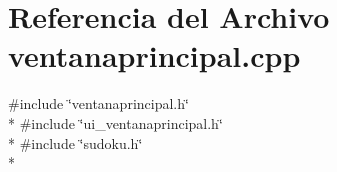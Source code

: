 \section{Referencia del Archivo ventanaprincipal.\-cpp}
\label{ventanaprincipal_8cpp}
{\ttfamily \#include \char`\"{}ventanaprincipal.\-h\char`\"{}}\\*
{\ttfamily \#include \char`\"{}ui\-\_\-ventanaprincipal.\-h\char`\"{}}\\*
{\ttfamily \#include \char`\"{}sudoku.\-h\char`\"{}}\\*
